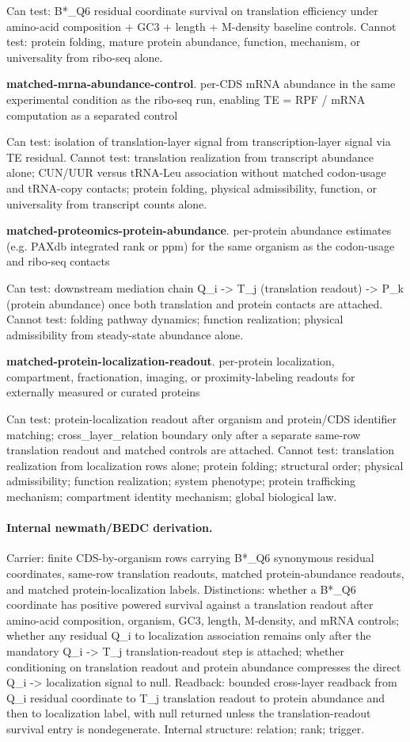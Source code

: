 Can test: B*\_Q6 residual coordinate survival on translation efficiency under amino-acid composition + GC3 + length + M-density baseline controls. Cannot test: protein folding, mature protein abundance, function, mechanism, or universality from ribo-seq alone.

\textbf{matched-mrna-abundance-control}. per-CDS mRNA abundance in the same experimental condition as the ribo-seq run, enabling TE = RPF / mRNA computation as a separated control

Can test: isolation of translation-layer signal from transcription-layer signal via TE residual. Cannot test: translation realization from transcript abundance alone; CUN/UUR versus tRNA-Leu association without matched codon-usage and tRNA-copy contacts; protein folding, physical admissibility, function, or universality from transcript counts alone.

\textbf{matched-proteomics-protein-abundance}. per-protein abundance estimates (e.g. PAXdb integrated rank or ppm) for the same organism as the codon-usage and ribo-seq contacts

Can test: downstream mediation chain Q\_i -> T\_j (translation readout) -> P\_k (protein abundance) once both translation and protein contacts are attached. Cannot test: folding pathway dynamics; function realization; physical admissibility from steady-state abundance alone.

\textbf{matched-protein-localization-readout}. per-protein localization, compartment, fractionation, imaging, or proximity-labeling readouts for externally measured or curated proteins

Can test: protein-localization readout after organism and protein/CDS identifier matching; cross\_layer\_relation boundary only after a separate same-row translation readout and matched controls are attached. Cannot test: translation realization from localization rows alone; protein folding; structural order; physical admissibility; function realization; system phenotype; protein trafficking mechanism; compartment identity mechanism; global biological law.

\paragraph{Internal newmath/BEDC derivation.} Carrier: finite CDS-by-organism rows carrying B*\_Q6 synonymous residual coordinates, same-row translation readouts, matched protein-abundance readouts, and matched protein-localization labels. Distinctions: whether a B*\_Q6 coordinate has positive powered survival against a translation readout after amino-acid composition, organism, GC3, length, M-density, and mRNA controls; whether any residual Q\_i to localization association remains only after the mandatory Q\_i -> T\_j translation-readout step is attached; whether conditioning on translation readout and protein abundance compresses the direct Q\_i -> localization signal to null. Readback: bounded cross-layer readback from Q\_i residual coordinate to T\_j translation readout to protein abundance and then to localization label, with null returned unless the translation-readout survival entry is nondegenerate. Internal structure: relation; rank; trigger.

